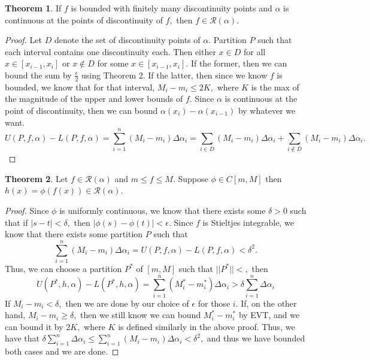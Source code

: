 \documentclass[10pt, oneside]{article}
\theoremstyle{definition}
\newtheorem{thm}{Theorem}
\begin{document}
\begin{thm}
    If $f$ is bounded with finitely many discontinuity points and $\alpha$ is continuous at the points of discontinuity of $f,$ then $f \in \mathcal{R}(\alpha).$
\end{thm}
\begin{proof}
    Let $D$ denote the set of discontinuity points of $\alpha.$ Partition $P$ such that each interval contains one discontinuity each. Then either $x \in D$ for all $x \in [x_{i-1}, x_i]$ or $x\notin D$ for some $x \in [x_{i-1}, x_i].$ If the former, then we can bound the sum by $\frac{\epsilon}{2}$ using Theorem 2. If the latter, then since we know $f$ is bounded, we know that for that interval, $M_i - m_i \leq 2K,$ where $K$ is the max of the magnitude of the upper and lower bounds of $f.$ Since $\alpha$ is continuous at the point of discontinuity, then we can bound $\alpha(x_i) - \alpha(x_{i-1})$ by whatever we want.
    \[U(P,f, \alpha) - L(P, f, \alpha) = \sum_{i=1}^n (M_i - m_i)\Delta \alpha_i = \sum_{i\in D}(M_i - m_i)\Delta \alpha_i + \sum_{i\notin D}(M_i - m_i)\Delta \alpha_i.\]
\end{proof}

\begin{thm}
    Let $f\in \mathcal{R}(\alpha)$ and $m\leq f \leq M.$ Suppose $\phi \in C[m, M ]$ then $h(x) = \phi(f(x)) \in \mathcal{R}(\alpha).$ 
\end{thm}

\begin{proof}
    Since $\phi$ is uniformly continuous, we know that there exists some $\delta>0$ such that if $|s-t|< \delta,$ then $|\phi(s) - \phi(t)|< \epsilon.$ Since $f$ is Stieltjes integrable, we know that there exists some partition $P$ such that 
    \[\sum_{i=1}^n (M_i - m_i)\Delta \alpha_i = U(P, f, \alpha) - L(P, f, \alpha)< \delta^2.\] Thus, we can choose a partition $P^\ast$ of $[m, M]$ such that $||P^\ast||< ,$ then 
    \[U(P^\ast, h, \alpha) - L(P^\ast, h, \alpha) = \sum_{i=1}^n (M_i^\ast - m_i^\ast) \Delta \alpha_i> \delta \sum_{i=1}^n \Delta\alpha_i\] If $M_i - m_i < \delta,$ then  we are done by our choice of $\epsilon$ for those $i.$ If, on the other hand, $M_i - m_i \geq \delta,$ then we still know we can bound  $M_i^\ast - m_i^\ast$ by EVT, and we can bound it by $2K,$ where $K$ is defined similarly in the above proof. Thus, we have that $\delta\sum_{i=1}^n\Delta\alpha_i \leq\sum_{i=1}^n (M_i - m_i)\Delta \alpha_i < \delta^2,$ and thus we have bounded both cases and we are done.
\end{proof}
\newpage
\end{document}
